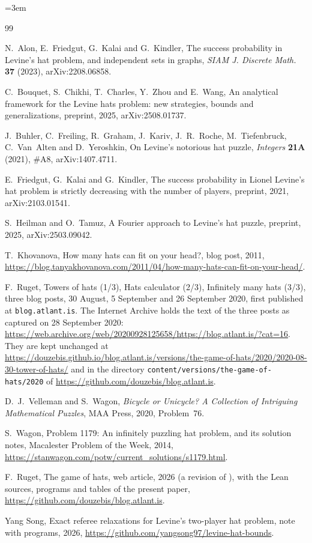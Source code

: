 \documentclass[11pt,a4paper]{article}
\theoremstyle{definition}
\theoremstyle{remark}
\newcommand{\repo}{\url{https://github.com/douzebis/blog.atlant.is}}
\begin{document}
\emergencystretch=3em
\begin{thebibliography}{99}

 N.~Alon, E.~Friedgut, G.~Kalai and G.~Kindler, The
success probability in Levine's hat problem, and independent sets in
graphs, \emph{SIAM J. Discrete Math.} \textbf{37} (2023),
arXiv:2208.06858.

 C.~Bouquet, S.~Chikhi, T.~Charles, Y.~Zhou and E.~Wang,
An analytical framework for the Levine hats problem: new strategies,
bounds and generalizations, preprint, 2025, arXiv:2508.01737.

 J.~Buhler, C.~Freiling, R.~Graham, J.~Kariv, J.~R.~Roche,
M.~Tiefenbruck, C.~Van~Alten and D.~Yeroshkin, On Levine's notorious hat
puzzle, \emph{Integers} \textbf{21A} (2021), \#A8, arXiv:1407.4711.

 E.~Friedgut, G.~Kalai and G.~Kindler, The success
probability in Lionel Levine's hat problem is strictly decreasing with
the number of players, preprint, 2021, arXiv:2103.01541.

 S.~Heilman and O.~Tamuz, A Fourier approach to Levine's
hat puzzle, preprint, 2025, arXiv:2503.09042.

 T.~Khovanova, How many hats can fit on your head?, blog
post, 2011,
\url{https://blog.tanyakhovanova.com/2011/04/how-many-hats-can-fit-on-your-head/}.

 F.~Ruget, Towers of hats (1/3), Hats calculator (2/3),
Infinitely many hats (3/3), three blog posts, 30 August, 5 September and
26 September 2020, first published at \texttt{blog.atlant.is}. The
Internet Archive holds the text of the three posts as captured on
28 September 2020:
\url{https://web.archive.org/web/20200928125658/https://blog.atlant.is/?cat=16}.
They are kept unchanged at
\url{https://douzebis.github.io/blog.atlant.is/versions/the-game-of-hats/2020/2020-08-30-tower-of-hats/}
and in the directory \texttt{content/versions/the-game-of-hats/2020} of
\repo.

 D.~J.~Velleman and S.~Wagon, \emph{Bicycle or Unicycle? A
Collection of Intriguing Mathematical Puzzles}, MAA Press, 2020,
Problem~76.

 S.~Wagon, Problem 1179: An infinitely puzzling hat
problem, and its solution notes, Macalester Problem of the Week, 2014,
\url{https://stanwagon.com/potw/current_solutions/s1179.html}.

 F.~Ruget, The game of hats, web article, 2026 (a revision of
\cite{R20}), with the Lean sources, programs and tables of the present
paper, \repo.

 Yang Song, Exact referee relaxations for Levine's
two-player hat problem, note with programs, 2026,
\url{https://github.com/yangsong97/levine-hat-bounds}.

\end{thebibliography}
\end{document}
